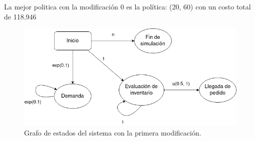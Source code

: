 \documentclass[12pt, spanish]{article}
\begin{document}
La mejor politica con la modificación 0 es la política: (20, 60) con un costo total de 118.946



\begin{figure}[H]
  \centering
   \includegraphics[width=\textwidth]{grafo_sucesos_mod1.png}
	\caption{Grafo de estados del sistema con la primera modificación.}
\end{figure}
\end{document}
